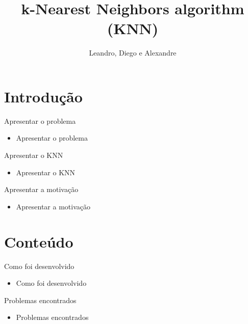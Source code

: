 \documentclass[11pt]{beamer}
\author{Leandro, Diego e Alexandre}
\title{k-Nearest Neighbors algorithm (KNN)}
\begin{document}
\begin{frame}
\titlepage
\end{frame}

\begin{frame}
\tableofcontents
\end{frame}

\section{Introdução}
\begin{frame}{Apresentar o problema}

\begin{itemize}
	\item Apresentar o problema
\end{itemize}

\end{frame}

\begin{frame}{Apresentar o KNN}

\begin{itemize}
	\item Apresentar o KNN \cite{wiki:xxx}
\end{itemize}

\end{frame}


\begin{frame}{Apresentar a motivação}

\begin{itemize}
	\item Apresentar a motivação
\end{itemize}

\end{frame}

\section{Conteúdo}
\begin{frame}{Como foi desenvolvido}

\begin{itemize}
	\item Como foi desenvolvido
\end{itemize}

\end{frame}

\begin{frame}{Problemas encontrados}

\begin{itemize}
	\item Problemas encontrados
\end{itemize}

\end{frame}
\end{document}
